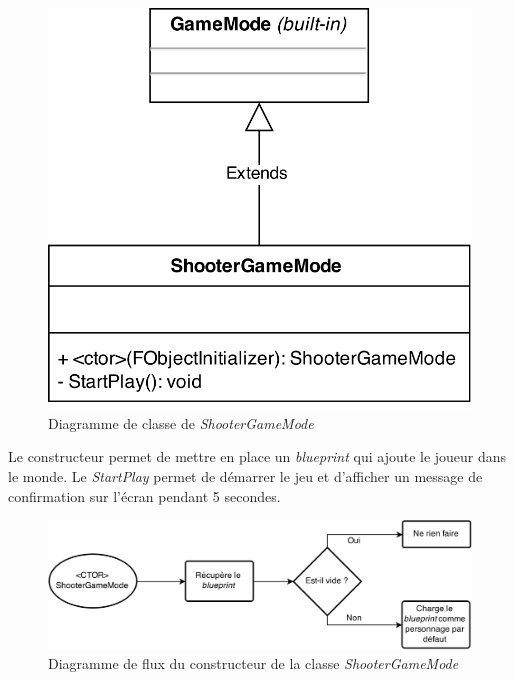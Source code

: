 \documentclass[11pt, a4paper, oneside]{article}
\begin{document}
\begin{figure}[htp]
	\begin{center}
	\includegraphics[scale=.25]{ShooterGameMode}
	\caption{Diagramme de classe de \emph{ShooterGameMode}}
	\label{fig:shootergamemode}
	\end{center}
\end{figure}

Le constructeur permet de mettre en place un \emph{blueprint} qui ajoute le joueur dans le monde. Le \emph{StartPlay} permet de démarrer le jeu et d'afficher un message de confirmation sur l'écran pendant 5 secondes.

\begin{figure}[htp]
	\begin{center}
	\includegraphics[width=\textwidth]{ShooterGameModeFlow}
	\caption{Diagramme de flux du constructeur de la classe \emph{ShooterGameMode}}
	\label{fig:shootergamemodeflow}
	\end{center}
\end{figure}
\end{document}
